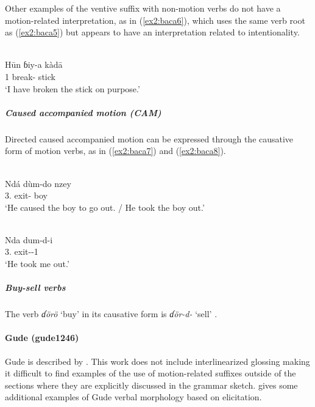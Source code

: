 Other examples of the ventive suffix with non-motion verbs do not have a motion-related interpretation, as in (\ref{ex2:baca6}), which uses the same verb root as (\ref{ex2:baca5}) but appears to have an interpretation related to intentionality. 

\ea\label{ex2:baca6}
 \\
\gll Hūn ɓiy-a kàdā	\\
1 break- stick		\\
\glt `I have broken the stick on purpose.'
\z 

\subparagraph{Caused accompanied motion (CAM)}

Directed caused accompanied motion can be expressed through the causative form of motion verbs, as in (\ref{ex2:baca7}) and (\ref{ex2:baca8}).

\ea\label{ex2:baca7}
 \\
\gll Ndá dùm-do nzey	\\
3. exit- boy		\\
\glt `He caused the boy to go out. / He took the boy out.'

\ex\label{ex2:baca8}
 \\
\gll Nda dum-d-i	\\
3. exit--1		\\
\glt `He took me out.'
\z 

\subparagraph{Buy-sell verbs}

The verb \textit{ɗörö} `buy' in its causative form is \textit{ɗör-d-} `sell' \citep[162]{pweddonBwatiyeEnglishDictionary2001}.

\paragraph*{Gude (gude1246)} \label{gude}

Gude is described by \citet{hoskinsonGrammarDictionaryGude1983}. This work does not include interlinearized glossing making it difficult to find examples of the use of motion-related suffixes outside of the sections where they are explicitly discussed in the grammar sketch. \citet[353–355, 359–361]{schuhChadicCornucopia2017} gives some additional examples of Gude verbal morphology based on elicitation. 

